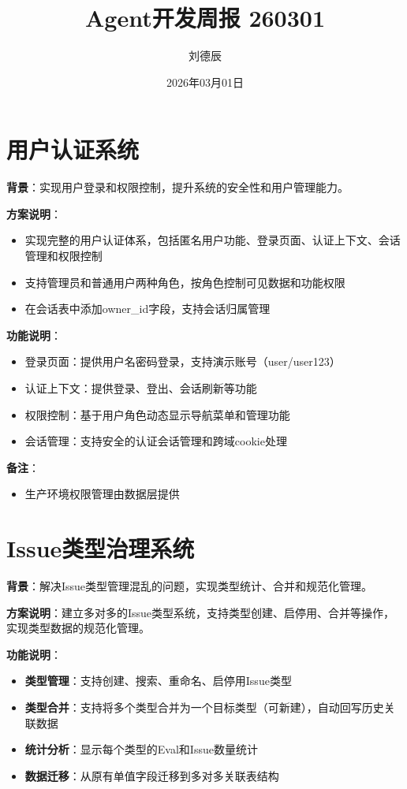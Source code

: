 \documentclass[UTF8]{ctexart}
\title{Agent开发周报 260301}
\author{刘德辰}
\date{2026年03月01日}
\begin{document}
\maketitle

\section{用户认证系统}

\textbf{背景}：实现用户登录和权限控制，提升系统的安全性和用户管理能力。

\textbf{方案说明}：
\begin{itemize}
\item 实现完整的用户认证体系，包括匿名用户功能、登录页面、认证上下文、会话管理和权限控制
\item 支持管理员和普通用户两种角色，按角色控制可见数据和功能权限
\item 在会话表中添加owner\_id字段，支持会话归属管理
\end{itemize}

\textbf{功能说明}：
\begin{itemize}
\item 登录页面：提供用户名密码登录，支持演示账号（user/user123）
\item 认证上下文：提供登录、登出、会话刷新等功能
\item 权限控制：基于用户角色动态显示导航菜单和管理功能
\item 会话管理：支持安全的认证会话管理和跨域cookie处理
\end{itemize}

\textbf{备注}：
\begin{itemize}
\item 生产环境权限管理由数据层提供
\end{itemize}

\section{Issue类型治理系统}

\textbf{背景}：解决Issue类型管理混乱的问题，实现类型统计、合并和规范化管理。

\textbf{方案说明}：建立多对多的Issue类型系统，支持类型创建、启停用、合并等操作，实现类型数据的规范化管理。

\textbf{功能说明}：
\begin{itemize}
\item \textbf{类型管理}：支持创建、搜索、重命名、启停用Issue类型
\item \textbf{类型合并}：支持将多个类型合并为一个目标类型（可新建），自动回写历史关联数据
\item \textbf{统计分析}：显示每个类型的Eval和Issue数量统计
\item \textbf{数据迁移}：从原有单值字段迁移到多对多关联表结构
\end{itemize}
\end{document}
